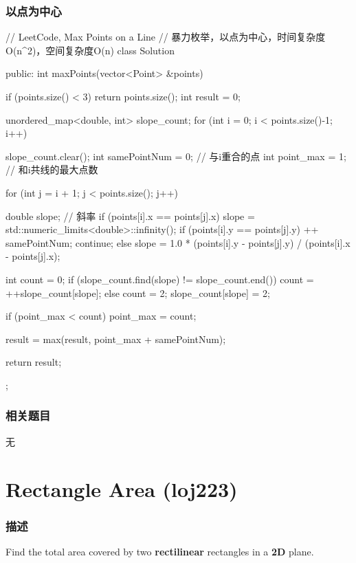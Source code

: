 \subsubsection{以点为中心}
\begin{Code}
// LeetCode, Max Points on a Line
// 暴力枚举，以点为中心，时间复杂度O(n^2)，空间复杂度O(n)
class Solution {
public:
    int maxPoints(vector<Point> &points) {
        if (points.size() < 3) return points.size();
        int result = 0;

        unordered_map<double, int> slope_count;
        for (int i = 0; i < points.size()-1; i++) {
            slope_count.clear();
            int samePointNum = 0; // 与i重合的点
            int point_max = 1;    // 和i共线的最大点数

            for (int j = i + 1; j < points.size(); j++) {
                double slope; // 斜率
                if (points[i].x == points[j].x) {
                    slope = std::numeric_limits<double>::infinity();
                    if (points[i].y == points[j].y) {
                        ++ samePointNum;
                        continue;
                    }
                } else {
                    slope = 1.0 * (points[i].y - points[j].y) / 
                        (points[i].x - points[j].x);
                }

                int count = 0;
                if (slope_count.find(slope) != slope_count.end())
                    count = ++slope_count[slope];
                else {
                    count = 2;
                    slope_count[slope] = 2;
                }

                if (point_max < count) point_max = count;
            }
            result = max(result, point_max + samePointNum);
        }
        return result;
    }
};
\end{Code}


\subsubsection{相关题目}
\begindot
\item 无
\myenddot

\section{Rectangle Area (loj223)} %
\label{sec:Rectangle-Area}

\subsubsection{描述}
Find the total area covered by two \textbf{rectilinear} rectangles in a \textbf{2D} plane.

